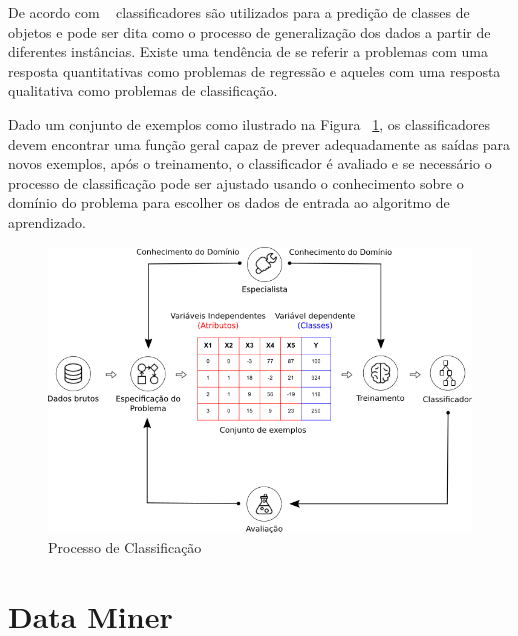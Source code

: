 De acordo com ~\cite{porthos_motta:2016} classificadores são utilizados para a predição de classes de objetos e pode ser dita como o processo de generalização dos dados a partir de diferentes instâncias. Existe uma tendência de se referir a problemas com uma resposta quantitativas como problemas de regressão e aqueles com uma resposta qualitativa como problemas de classificação.

Dado um conjunto de exemplos como ilustrado na Figura ~\ref{fig:processo_classificacao}, os classificadores devem encontrar uma função geral capaz de prever adequadamente as saídas para novos exemplos, após o treinamento, o classificador é avaliado e se necessário o processo de classificação pode ser ajustado usando o conhecimento sobre o domínio do problema para escolher os dados de entrada ao algoritmo de aprendizado. 


\begin{figure}[H]
\begin{center}
    \includegraphics[scale=0.75]{figuras/processo_classificacao.png}
\end{center}
\caption{Processo de Classificação}
\label{fig:processo_classificacao}
\end{figure}


\section{Data Miner}


